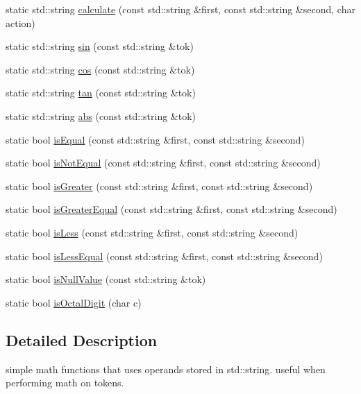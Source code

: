 \begin{DoxyCompactItemize}
\item 
static std\-::string \hyperlink{class_math_lib_a80a5c6b58403d1f9212681eb6dbcbf54}{calculate} (const std\-::string \&first, const std\-::string \&second, char action)
\item 
static std\-::string \hyperlink{class_math_lib_a56d18be030e3890125af0f2745ff315a}{sin} (const std\-::string \&tok)
\item 
static std\-::string \hyperlink{class_math_lib_a8588739566b8edcb5d4f32e6722b6301}{cos} (const std\-::string \&tok)
\item 
static std\-::string \hyperlink{class_math_lib_aeed9f6330e3fa584bfd015472b51c72e}{tan} (const std\-::string \&tok)
\item 
static std\-::string \hyperlink{class_math_lib_aa3afbc6e3f1b363833f1e6fc07c68134}{abs} (const std\-::string \&tok)
\item 
static bool \hyperlink{class_math_lib_a54b7d8eb2cf2ae3271159a6a425bfb24}{is\-Equal} (const std\-::string \&first, const std\-::string \&second)
\item 
static bool \hyperlink{class_math_lib_a7439a0f485a2d6a9891b972ee6bff619}{is\-Not\-Equal} (const std\-::string \&first, const std\-::string \&second)
\item 
static bool \hyperlink{class_math_lib_a8ec17a671cf50fb7a1ab50ef72b570fd}{is\-Greater} (const std\-::string \&first, const std\-::string \&second)
\item 
static bool \hyperlink{class_math_lib_a628dcccf3f569468a31ef06f91b2affb}{is\-Greater\-Equal} (const std\-::string \&first, const std\-::string \&second)
\item 
static bool \hyperlink{class_math_lib_ab7f521c9fffe0becdc2839fb6af338db}{is\-Less} (const std\-::string \&first, const std\-::string \&second)
\item 
static bool \hyperlink{class_math_lib_a2d198d0a829da590b6fceb0e6c16df46}{is\-Less\-Equal} (const std\-::string \&first, const std\-::string \&second)
\item 
static bool \hyperlink{class_math_lib_a51944685df92dd1e3b77ec2e55e71cb3}{is\-Null\-Value} (const std\-::string \&tok)
\item 
static bool \hyperlink{class_math_lib_a729f86ba03f2ecf5ed8ea8746dca8387}{is\-Octal\-Digit} (char c)
\end{DoxyCompactItemize}


\subsection{Detailed Description}
simple math functions that uses operands stored in std\-::string. useful when performing math on tokens. 

